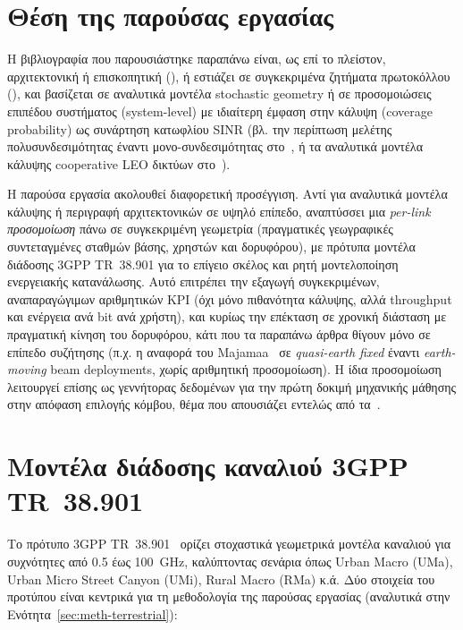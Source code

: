 \section{Θέση της παρούσας εργασίας}
\label{sec:bg-positioning}

Η βιβλιογραφία που παρουσιάστηκε παραπάνω είναι, ως επί το πλείστον,
αρχιτεκτονική ή επισκοπητική (\cite{li2025advancing, majamaa2024toward}),
ή εστιάζει σε συγκεκριμένα ζητήματα πρωτοκόλλου (\cite{noh2024tnntn}), και
βασίζεται σε αναλυτικά μοντέλα stochastic geometry ή σε προσομοιώσεις
επιπέδου συστήματος (system-level) με ιδιαίτερη έμφαση στην κάλυψη
(coverage probability) ως συνάρτηση κατωφλίου SINR (βλ. την περίπτωση
μελέτης πολυσυνδεσιμότητας έναντι μονο-συνδεσιμότητας
στο~\cite{li2025advancing}, ή τα αναλυτικά μοντέλα κάλυψης cooperative LEO
δικτύων στο~\cite{shang2023coverage}).

Η παρούσα εργασία ακολουθεί διαφορετική προσέγγιση. Αντί για αναλυτικά
μοντέλα κάλυψης ή περιγραφή αρχιτεκτονικών σε υψηλό επίπεδο, αναπτύσσει
μια \emph{per-link προσομοίωση} πάνω σε συγκεκριμένη γεωμετρία
(πραγματικές γεωγραφικές συντεταγμένες σταθμών βάσης, χρηστών και
δορυφόρου), με πρότυπα μοντέλα διάδοσης 3GPP TR~38.901 για το επίγειο
σκέλος και ρητή μοντελοποίηση ενεργειακής κατανάλωσης. Αυτό επιτρέπει την
εξαγωγή συγκεκριμένων, αναπαραγώγιμων αριθμητικών KPI (όχι μόνο πιθανότητα
κάλυψης, αλλά throughput και ενέργεια ανά bit ανά χρήστη), και κυρίως την
επέκταση σε χρονική διάσταση με πραγματική κίνηση του δορυφόρου, κάτι που
τα παραπάνω άρθρα θίγουν μόνο σε επίπεδο συζήτησης (π.χ. η αναφορά του
Majamaa~\cite{majamaa2024toward} σε \emph{quasi-earth fixed} έναντι
\emph{earth-moving} beam deployments, χωρίς αριθμητική προσομοίωση). Η
ίδια προσομοίωση λειτουργεί επίσης ως γεννήτορας δεδομένων για την πρώτη
δοκιμή μηχανικής μάθησης στην απόφαση επιλογής κόμβου, θέμα που απουσιάζει
εντελώς από τα~\cite{li2025advancing, noh2024tnntn, majamaa2024toward}.

\section{Μοντέλα διάδοσης καναλιού 3GPP TR~38.901}
\label{sec:bg-channel-model}

Το πρότυπο 3GPP TR~38.901~\cite{tr38901} ορίζει στοχαστικά γεωμετρικά
μοντέλα καναλιού για συχνότητες από 0.5 έως 100~GHz, καλύπτοντας σενάρια
όπως Urban Macro (UMa), Urban Micro Street Canyon (UMi), Rural Macro (RMa)
κ.ά. Δύο στοιχεία του προτύπου είναι κεντρικά για τη μεθοδολογία της
παρούσας εργασίας (αναλυτικά στην Ενότητα~\ref{sec:meth-terrestrial}):

